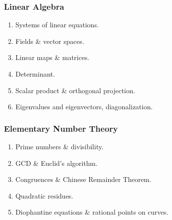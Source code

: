 \documentclass[a4paper,11pt]{article}
\begin{document}
\subsubsection*{Linear Algebra}
\begin{enumerate}
 \item Systems of linear equations.
 \item Fields \& vector spaces.
 \item Linear maps \& matrices.
 \item Determinant.
 \item Scalar product \& orthogonal projection.
 \item Eigenvalues and eigenvectors, diagonalization.
\end{enumerate}

\subsubsection*{Elementary Number Theory}
\begin{enumerate}
 \item Prime numbers \& divisibility.
 \item GCD \& Euclid's algorithm.
 \item Congruences \& Chinese Remainder Theorem.
 \item Quadratic residues.
 \item Diophantine equations \& rational points on curves.
\end{enumerate}
\end{document}
